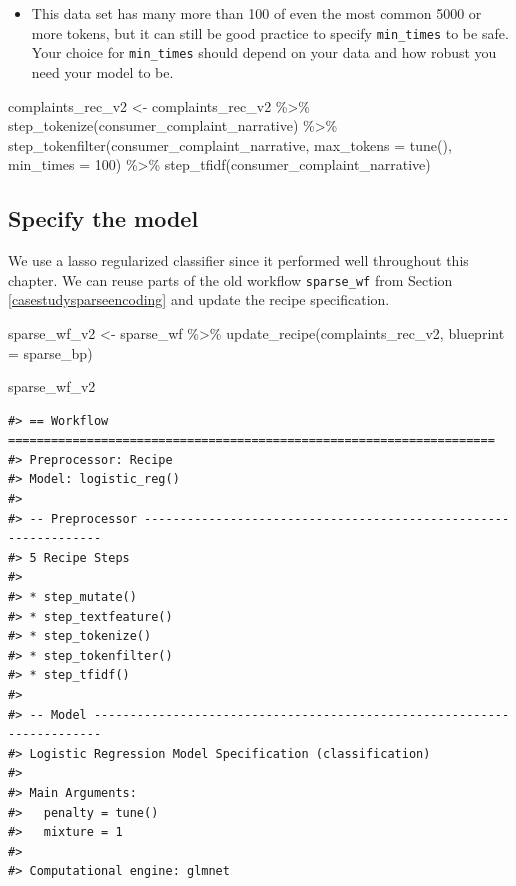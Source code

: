 \documentclass[
]{krantz}
\makeatletter
\newenvironment{Shaded}{\begin{snugshade}}{\end{snugshade}}
\newcommand{\AttributeTok}[1]{\textcolor[rgb]{0.77,0.63,0.00}{#1}}
\newcommand{\DecValTok}[1]{\textcolor[rgb]{0.00,0.00,0.81}{#1}}
\newcommand{\FunctionTok}[1]{\textcolor[rgb]{0.00,0.00,0.00}{#1}}
\newcommand{\NormalTok}[1]{#1}
\newcommand{\OtherTok}[1]{\textcolor[rgb]{0.56,0.35,0.01}{#1}}
\newcommand{\SpecialCharTok}[1]{\textcolor[rgb]{0.00,0.00,0.00}{#1}}
\newenvironment{kframe}{%
\medskip{}
\setlength{\fboxsep}{.8em}
 \def\at@end@of@kframe{}%
 \ifinner\ifhmode%
  \def\at@end@of@kframe{\end{minipage}}%
  \begin{minipage}{\columnwidth}%
 \fi\fi%
 \def\FrameCommand##1{\hskip\@totalleftmargin \hskip-\fboxsep
 \colorbox{shadecolor}{##1}\hskip-\fboxsep
     \hskip-\linewidth \hskip-\@totalleftmargin \hskip\columnwidth}%
 \MakeFramed {\advance\hsize-\width
   \@totalleftmargin\z@ \linewidth\hsize
   \@setminipage}}%
 {\par\unskip\endMakeFramed%
 \at@end@of@kframe}
\renewenvironment{Shaded}{\begin{kframe}}{\end{kframe}}
\newenvironment{rmdblock}[1]
  {\begin{shaded*}
  \begin{itemize}[left = -1cm, labelsep = 1cm]
  \renewcommand{\labelitemi}{
    \raisebox{-.7\height}[0pt][0pt]{
      {\setkeys{Gin}{width=3em,keepaspectratio}\texttt{[image: images/\#1]}}
    }
  }
 
  \item
  }
  {
  \end{itemize}
  \end{shaded*}
  }
\newenvironment{rmdnote}
  {\begin{rmdblock}{note}}
  {\end{rmdblock}}
\makeatother
\begin{document}
\begin{rmdnote}
This data set has many more than 100 of even the most common 5000 or
more tokens, but it can still be good practice to specify
\texttt{min\_times} to be safe. Your choice for \texttt{min\_times}
should depend on your data and how robust you need your model to be.
\end{rmdnote}

\begin{Shaded}
\begin{Highlighting}[]
\NormalTok{complaints\_rec\_v2 }\OtherTok{\textless{}{-}}\NormalTok{ complaints\_rec\_v2 }\SpecialCharTok{\%\textgreater{}\%}
  \FunctionTok{step\_tokenize}\NormalTok{(consumer\_complaint\_narrative) }\SpecialCharTok{\%\textgreater{}\%}
  \FunctionTok{step\_tokenfilter}\NormalTok{(consumer\_complaint\_narrative,}
                   \AttributeTok{max\_tokens =} \FunctionTok{tune}\NormalTok{(), }\AttributeTok{min\_times =} \DecValTok{100}\NormalTok{) }\SpecialCharTok{\%\textgreater{}\%}
  \FunctionTok{step\_tfidf}\NormalTok{(consumer\_complaint\_narrative)}
\end{Highlighting}
\end{Shaded}

\hypertarget{specify-the-model-1}{%
\subsection{Specify the model}\label{specify-the-model-1}}

We use a lasso regularized classifier since it performed well throughout this chapter. We can reuse parts of the old workflow \texttt{sparse\_wf} from Section \ref{casestudysparseencoding} and update the recipe specification.

\begin{Shaded}
\begin{Highlighting}[]
\NormalTok{sparse\_wf\_v2 }\OtherTok{\textless{}{-}}\NormalTok{ sparse\_wf }\SpecialCharTok{\%\textgreater{}\%}
  \FunctionTok{update\_recipe}\NormalTok{(complaints\_rec\_v2, }\AttributeTok{blueprint =}\NormalTok{ sparse\_bp)}

\NormalTok{sparse\_wf\_v2}
\end{Highlighting}
\end{Shaded}

\begin{verbatim}
#> == Workflow ====================================================================
#> Preprocessor: Recipe
#> Model: logistic_reg()
#> 
#> -- Preprocessor ----------------------------------------------------------------
#> 5 Recipe Steps
#> 
#> * step_mutate()
#> * step_textfeature()
#> * step_tokenize()
#> * step_tokenfilter()
#> * step_tfidf()
#> 
#> -- Model -----------------------------------------------------------------------
#> Logistic Regression Model Specification (classification)
#> 
#> Main Arguments:
#>   penalty = tune()
#>   mixture = 1
#> 
#> Computational engine: glmnet
\end{verbatim}
\end{document}
